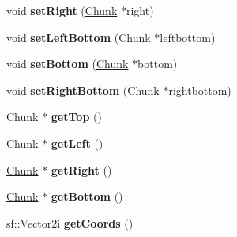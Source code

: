 \begin{DoxyCompactItemize}
\item 
\hypertarget{class_chunk_a670d58217b329583811b5380f25700d6}{void {\bfseries set\-Right} (\hyperlink{class_chunk}{Chunk} $\ast$right)}\label{class_chunk_a670d58217b329583811b5380f25700d6}

\item 
\hypertarget{class_chunk_a690d801cad525f106f11fca76855c785}{void {\bfseries set\-Left\-Bottom} (\hyperlink{class_chunk}{Chunk} $\ast$leftbottom)}\label{class_chunk_a690d801cad525f106f11fca76855c785}

\item 
\hypertarget{class_chunk_a57c85ac8a8959eca362b7c3e64dc1d0d}{void {\bfseries set\-Bottom} (\hyperlink{class_chunk}{Chunk} $\ast$bottom)}\label{class_chunk_a57c85ac8a8959eca362b7c3e64dc1d0d}

\item 
\hypertarget{class_chunk_aadab4832f4d1c4618b7232a1503d8aed}{void {\bfseries set\-Right\-Bottom} (\hyperlink{class_chunk}{Chunk} $\ast$rightbottom)}\label{class_chunk_aadab4832f4d1c4618b7232a1503d8aed}

\item 
\hypertarget{class_chunk_a161929ca5dcfa0e1a798999f989fe2f8}{\hyperlink{class_chunk}{Chunk} $\ast$ {\bfseries get\-Top} ()}\label{class_chunk_a161929ca5dcfa0e1a798999f989fe2f8}

\item 
\hypertarget{class_chunk_a43c3b2b5995d06baec16ab9935a315fa}{\hyperlink{class_chunk}{Chunk} $\ast$ {\bfseries get\-Left} ()}\label{class_chunk_a43c3b2b5995d06baec16ab9935a315fa}

\item 
\hypertarget{class_chunk_ad13a4e8ac481c7de6a70b3fa461418cf}{\hyperlink{class_chunk}{Chunk} $\ast$ {\bfseries get\-Right} ()}\label{class_chunk_ad13a4e8ac481c7de6a70b3fa461418cf}

\item 
\hypertarget{class_chunk_a59eb282f08711420c1e966e30aab47e3}{\hyperlink{class_chunk}{Chunk} $\ast$ {\bfseries get\-Bottom} ()}\label{class_chunk_a59eb282f08711420c1e966e30aab47e3}

\item 
\hypertarget{class_chunk_ad8d9253e661bbaef3471b73b86f0d8c4}{sf\-::\-Vector2i {\bfseries get\-Coords} ()}\label{class_chunk_ad8d9253e661bbaef3471b73b86f0d8c4}

\end{DoxyCompactItemize}
